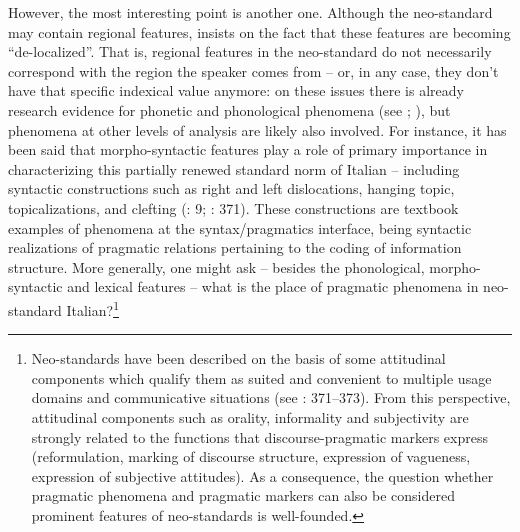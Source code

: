 \hspace*{-0.3pt}However, the most interesting point is another one. Although the neo-standard may contain regional features, \citet[368]{Auer2017} insists on the fact that these features are becoming “de-localized”. That is, regional features in the neo-standard do not necessarily correspond with the region the speaker comes from – or, in any case, they don’t have that specific indexical value anymore: on these issues there is already research evidence for phonetic and phonological phenomena (see \citealt{Crocco2017}; \citealt{PascaleEtAl2017}), but phenomena at other levels of analysis are likely also involved. For instance, it has been said that morpho-syntactic features play a role of primary importance in characterizing this partially renewed standard norm of Italian – including syntactic constructions such as right and left dislocations, hanging topic, topicalizations, and clefting (\citealt{CerrutiEtAl2017}: 9; \citealt{Auer2017}: 371). These constructions are textbook examples of phenomena at the syntax/pragmatics interface, being syntactic realizations of pragmatic relations pertaining to the coding of information structure. More generally, one might ask – besides the phonological, morpho-syntactic and lexical features – what is the place of pragmatic phenomena in neo-standard Italian?\footnote{Neo-standards have been described on the basis of some attitudinal components which qualify them as suited and convenient to multiple usage domains and communicative situations (see \citealt{Auer2017}: 371–373). From this perspective, attitudinal components such as orality, informality and subjectivity are strongly related to the functions that discourse-pragmatic markers express (reformulation, marking of discourse structure, expression of vagueness, expression of subjective attitudes). As a consequence, the question whether pragmatic phenomena and pragmatic markers can also be considered prominent features of neo-standards is well-founded.}

